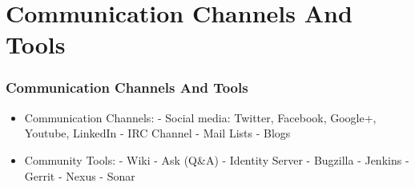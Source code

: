 \section{Communication Channels And Tools}

\begin{frame}[allowframebreaks]
\frametitle{Communication Channels And Tools}

\begin{itemize}
 \item Communication Channels:\linebreak
 - Social media: Twitter, Facebook, Google+, Youtube, LinkedIn\linebreak
 - IRC Channel\linebreak
 - Mail Lists\linebreak
 - Blogs
 \item Community Tools:\linebreak
 - Wiki\linebreak
 - Ask (Q\&A)\linebreak
 - Identity Server\linebreak
 - Bugzilla\linebreak
 - Jenkins\linebreak
 - Gerrit\linebreak
 - Nexus\linebreak
 - Sonar
\end{itemize}

\end{frame}
